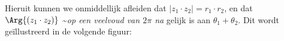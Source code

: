 Hieruit kunnen we onmiddellijk afleiden dat   \(|z_1 \cdot
z_2| = r_1 \cdot r_2\), en dat
\(\Arg{(z_1 \cdot z_2)}\)
\textasciitilde{}\emph{op een veelvoud van   $2\pi$  na}  gelijk is aan   \(\theta_1 + \theta_2\).
Dit wordt geïllustreerd in de volgende figuur:
